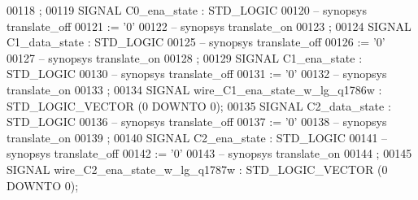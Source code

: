 \begin{DoxyCode}
{00118      ;
00119      \textcolor{keywordflow}{SIGNAL}  \textcolor{vhdlchar}{C0_ena_state}   \textcolor{vhdlchar}{:}   \textcolor{comment}{STD\_LOGIC}
00120 \textcolor{keyword}{     -- synopsys translate\_off}
00121       \textcolor{vhdlchar}{:=} \textcolor{vhdlchar}{'}\textcolor{vhdllogic}{}\textcolor{vhdllogic}{0}\textcolor{vhdlchar}{'}
00122 \textcolor{keyword}{     -- synopsys translate\_on}
00123      ;
00124      \textcolor{keywordflow}{SIGNAL}  \textcolor{vhdlchar}{C1_data_state}  \textcolor{vhdlchar}{:}   \textcolor{comment}{STD\_LOGIC}
00125 \textcolor{keyword}{     -- synopsys translate\_off}
00126       \textcolor{vhdlchar}{:=} \textcolor{vhdlchar}{'}\textcolor{vhdllogic}{}\textcolor{vhdllogic}{0}\textcolor{vhdlchar}{'}
00127 \textcolor{keyword}{     -- synopsys translate\_on}
00128      ;
00129      \textcolor{keywordflow}{SIGNAL}  \textcolor{vhdlchar}{C1_ena_state}   \textcolor{vhdlchar}{:}   \textcolor{comment}{STD\_LOGIC}
00130 \textcolor{keyword}{     -- synopsys translate\_off}
00131       \textcolor{vhdlchar}{:=} \textcolor{vhdlchar}{'}\textcolor{vhdllogic}{}\textcolor{vhdllogic}{0}\textcolor{vhdlchar}{'}
00132 \textcolor{keyword}{     -- synopsys translate\_on}
00133      ;
00134      \textcolor{keywordflow}{SIGNAL}  \textcolor{vhdlchar}{wire_C1_ena_state_w_lg_q1786w}  \textcolor{vhdlchar}{:}   \textcolor{comment}{STD\_LOGIC\_VECTOR} \textcolor{vhdlchar}{(}\textcolor{vhdllogic}{}\textcolor{vhdllogic}{0} \textcolor{keywordflow}{DOWNTO} \textcolor{vhdllogic}{}\textcolor{vhdllogic}{0}\textcolor{vhdlchar}{)};
00135      \textcolor{keywordflow}{SIGNAL}  \textcolor{vhdlchar}{C2_data_state}  \textcolor{vhdlchar}{:}   \textcolor{comment}{STD\_LOGIC}
00136 \textcolor{keyword}{     -- synopsys translate\_off}
00137       \textcolor{vhdlchar}{:=} \textcolor{vhdlchar}{'}\textcolor{vhdllogic}{}\textcolor{vhdllogic}{0}\textcolor{vhdlchar}{'}
00138 \textcolor{keyword}{     -- synopsys translate\_on}
00139      ;
00140      \textcolor{keywordflow}{SIGNAL}  \textcolor{vhdlchar}{C2_ena_state}   \textcolor{vhdlchar}{:}   \textcolor{comment}{STD\_LOGIC}
00141 \textcolor{keyword}{     -- synopsys translate\_off}
00142       \textcolor{vhdlchar}{:=} \textcolor{vhdlchar}{'}\textcolor{vhdllogic}{}\textcolor{vhdllogic}{0}\textcolor{vhdlchar}{'}
00143 \textcolor{keyword}{     -- synopsys translate\_on}
00144      ;
00145      \textcolor{keywordflow}{SIGNAL}  \textcolor{vhdlchar}{wire_C2_ena_state_w_lg_q1787w}  \textcolor{vhdlchar}{:}   \textcolor{comment}{STD\_LOGIC\_VECTOR} \textcolor{vhdlchar}{(}\textcolor{vhdllogic}{}\textcolor{vhdllogic}{0} \textcolor{keywordflow}{DOWNTO} \textcolor{vhdllogic}{}\textcolor{vhdllogic}{0}\textcolor{vhdlchar}{)};
}
\end{DoxyCode}

